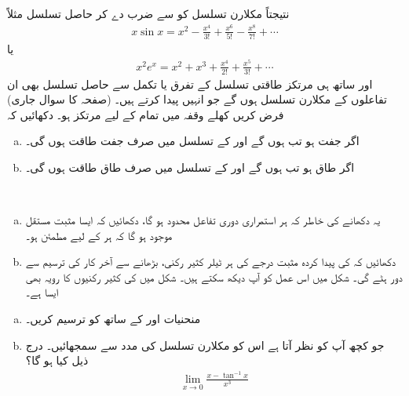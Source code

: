 نتیجتاً مکلارن تسلسل کو  سے ضرب دے کر حاصل تسلسل مثلاً 
\begin{align*}
x\sin x=x^2-\frac{x^4}{3!}+\frac{x^6}{5!}-\frac{x^8}{7!}+\cdots
\end{align*}
یا 
\begin{align*}
x^2e^x=x^2+x^3+\frac{x^4}{2!}+\frac{x^5}{3!}+\cdots
\end{align*}
اور ساتھ ہی مرتکز طاقتی تسلسل کے تفرق یا تکمل سے حاصل تسلسل بھی ان تفاعلوں  کے مکلارن تسلسل ہوں گے جو انہیں پیدا کرتے ہیں۔
 (صفحہ  کا سوال  جاری)\\
 فرض کریں  کھلے  وقفہ  میں تمام  کے لیے  مرتکز ہو۔ دکھائیں کہ
\begin{enumerate}[a.]
\item
اگر  جفت ہو تب  ہوں گے اور  کے تسلسل میں صرف جفت طاقت ہوں گی۔
\item
اگر  طاق ہو تب  ہوں گے اور  کے تسلسل میں صرف طاق طاقت ہوں گی۔
\end{enumerate}
\\
\begin{enumerate}[a.]
\item
یہ دکھانے کی خاطر کہ ہر استمراری دوری تفاعل  محدود ہو گا، دکھائیں کہ  ایسا مثبت مستقل  موجود ہو گا کہ   ہر  کے لیے   مطمئن ہو۔
\item
دکھائیں کہ  کی  پیدا کردہ مثبت درجے  کی   ہر ٹیلر کثیر رکنی،   بڑھانے سے آخر کار  کی ترسیم سے دور ہٹے گی۔ شکل  میں اس عمل کو آپ دیکھ سکتے ہیں۔  شکل  میں  کی کثیر رکنیوں کا رویہ بھی ایسا ہے۔
\end{enumerate}
\begin{enumerate}[a.]
\item
منحنیات  اور  کے ساتھ  کو ترسیم کریں۔
\item
جو کچھ آپ کو نظر آتا ہے اس کو مکلارن تسلسل کی مدد سے سمجھائیں۔ درج ذیل کیا ہو گا؟
\begin{align*}
\lim_{x\to 0}\tfrac{x-\tan^{-1}x}{x^3}
\end{align*} 
\end{enumerate}


